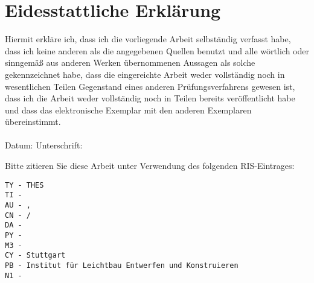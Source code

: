 \chapter*{Eidesstattliche Erklärung}
\label{erklaerung}
Hiermit erkläre ich, dass ich die vorliegende Arbeit selbständig verfasst habe, dass ich keine anderen als die angegebenen Quellen benutzt und alle wörtlich oder sinngemäß aus anderen Werken übernommenen Aussagen als solche gekennzeichnet habe, dass die eingereichte Arbeit weder vollständig noch in wesentlichen Teilen Gegenstand eines anderen Prüfungsverfahrens gewesen ist, dass ich die Arbeit weder vollständig noch in Teilen bereits veröffentlicht habe und dass das elektronische Exemplar mit den anderen Exemplaren übereinstimmt. \\
\\[1.5cm]
Datum:	\hrulefill\enspace Unterschrift: \hrulefill
\\[3.5cm]

\vfill

Bitte zitieren Sie diese Arbeit unter Verwendung des folgenden RIS-Eintrages:

\texttt{TY  - THES \\
TI  - \TitelDerArbeit \\
AU  - \StudentNachname, \StudentVorname \\
CN  - \NummerDerArbeit/ \\
DA  - \Abgabedatum \\
PY  - \EndeJahr \\
M3  - \TypDerArbeit \\
CY  - Stuttgart \\
PB  - Institut für Leichtbau Entwerfen und Konstruieren \\
N1  - \Betreuer
}
